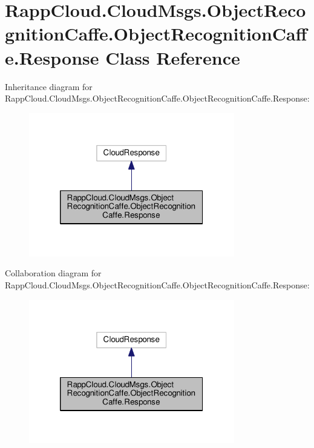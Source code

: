 \hypertarget{classRappCloud_1_1CloudMsgs_1_1ObjectRecognitionCaffe_1_1ObjectRecognitionCaffe_1_1Response}{\section{Rapp\-Cloud.\-Cloud\-Msgs.\-Object\-Recognition\-Caffe.\-Object\-Recognition\-Caffe.\-Response Class Reference}
\label{classRappCloud_1_1CloudMsgs_1_1ObjectRecognitionCaffe_1_1ObjectRecognitionCaffe_1_1Response}
}


Inheritance diagram for Rapp\-Cloud.\-Cloud\-Msgs.\-Object\-Recognition\-Caffe.\-Object\-Recognition\-Caffe.\-Response\-:
\nopagebreak
\begin{figure}[H]
\begin{center}
\leavevmode
\includegraphics[width=254pt]{classRappCloud_1_1CloudMsgs_1_1ObjectRecognitionCaffe_1_1ObjectRecognitionCaffe_1_1Response__inherit__graph}
\end{center}
\end{figure}


Collaboration diagram for Rapp\-Cloud.\-Cloud\-Msgs.\-Object\-Recognition\-Caffe.\-Object\-Recognition\-Caffe.\-Response\-:
\nopagebreak
\begin{figure}[H]
\begin{center}
\leavevmode
\includegraphics[width=254pt]{classRappCloud_1_1CloudMsgs_1_1ObjectRecognitionCaffe_1_1ObjectRecognitionCaffe_1_1Response__coll__graph}
\end{center}
\end{figure}
